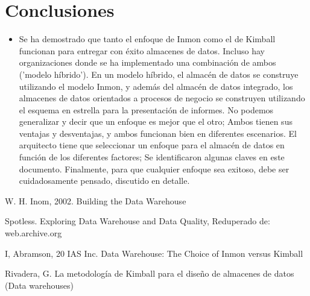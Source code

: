 \documentclass[twoside,twocolumn]{article}
\begin{document}
\section{Conclusiones}
\begin{itemize}	
\item Se ha demostrado que tanto el enfoque de Inmon como el de Kimball funcionan para entregar con éxito almacenes de datos. Incluso hay organizaciones donde se ha implementado una combinación de ambos ('modelo híbrido'). En un modelo híbrido, el almacén de datos se construye utilizando el modelo Inmon, y además del almacén de datos integrado, los almacenes de datos orientados a procesos de negocio se construyen utilizando el esquema en estrella para la presentación de informes. No podemos generalizar y decir que un enfoque es mejor que el otro; Ambos tienen sus ventajas y desventajas, y ambos funcionan bien en diferentes escenarios. El arquitecto tiene que seleccionar un enfoque para el almacén de datos en función de los diferentes factores; Se identificaron algunas claves en este documento. Finalmente, para que cualquier enfoque sea exitoso, debe ser cuidadosamente pensado, discutido en detalle. 

\end{itemize} 

\newpage



\begin{thebibliography}{99} 

\bibitem[1]{}
\newblock W. H. Inom, 2002. Building the Data Warehouse

\bibitem[2]{}
\newblock Spotless. Exploring Data Warehouse and Data Quality, Reduperado de: web.archive.org

\bibitem[3]{}
\newblock I, Abramson, 20 IAS Inc. Data Warehouse: The Choice of Inmon versus Kimball

\bibitem[4]{}
\newblock Rivadera, G. La metodología de Kimball para el diseño de almacenes de
datos (Data warehouses) 

\end{thebibliography}


\end{document}
